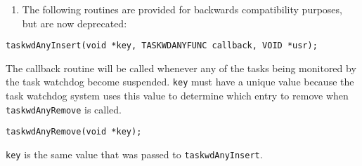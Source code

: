 \begin{description}
\end{description}\begin{verbatim}
\end{verbatim}\begin{enumerate}\item The following routines are provided for backwards compatibility purposes, but are now deprecated:

\end{enumerate}\begin{verbatim}
taskwdAnyInsert(void *key, TASKWDANYFUNC callback, VOID *usr);

\end{verbatim}\begin{description}\item The callback routine will be called whenever any of the tasks being monitored by the task watchdog become 
suspended. \verb|key| must have a unique value because the task watchdog system uses this value to determine which 
entry to remove when \verb|taskwdAnyRemove| is called.

\end{description}\begin{verbatim}
taskwdAnyRemove(void *key);

\end{verbatim}\begin{description}\item \verb|key| is the same value that was passed to \verb|taskwdAnyInsert|.

\end{description}


